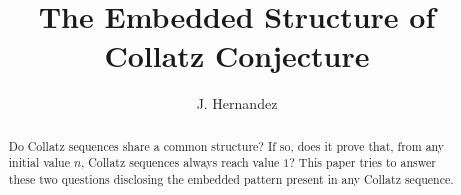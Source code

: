 \documentclass{jams-l}
\theoremstyle{definition}
\theoremstyle{remark}
\numberwithin{equation}{section}
\begin{document}
    \title{The Embedded Structure of Collatz Conjecture}
    \author{J. Hernandez}

    \begin{abstract}
        Do Collatz sequences share a common structure? If so, does it prove that, from any initial value $n$, Collatz sequences always reach value $1$? This paper tries to answer these two questions disclosing the embedded pattern present in any Collatz sequence.
    \end{abstract}
    
    \maketitle
\end{document}
